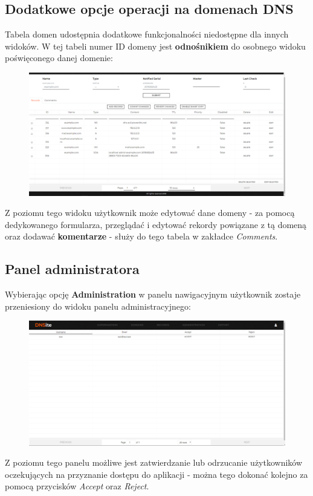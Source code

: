 \documentclass[12pt] {article}
\begin{document}
\subsection{Dodatkowe opcje operacji na domenach DNS}
Tabela domen udostępnia dodatkowe funkcjonalności niedostępne dla innych widoków. W tej tabeli numer ID domeny jest \textbf{odnośnikiem} do osobnego widoku poświęconego danej domenie:
\begin{figure}[H]
\centering
\includegraphics[width=\textwidth]{res/x_widok_domeny}
\end{figure}
Z poziomu tego widoku użytkownik może edytować dane domeny - za pomocą dedykowanego formularza, przeglądać i edytować rekordy powiązane z tą domeną oraz dodawać \textbf{komentarze} - służy do tego tabela w zakładce \emph{Comments}.


\subsection{Panel administratora}
Wybierając opcję \textbf{Administration} w panelu nawigacyjnym użytkownik zostaje przeniesiony do widoku panelu administracyjnego:
\begin{figure}[H]
\centering
\includegraphics[width=\textwidth]{res/x_panel_administracyjny}
\end{figure}
Z poziomu tego panelu możliwe jest zatwierdzanie lub odrzucanie użytkowników oczekujących na przyznanie dostępu do aplikacji - można tego dokonać kolejno za pomocą przycisków \emph{Accept} oraz \emph{Reject}.
\end{document}
